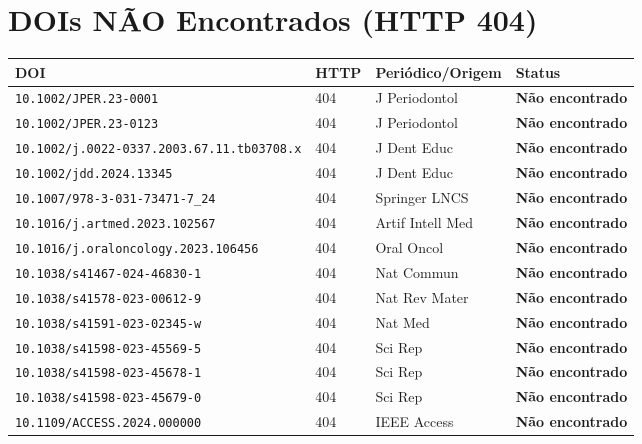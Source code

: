 \section{DOIs NÃO Encontrados (HTTP 404)}

\begin{longtable}{|p{3.5cm}|p{2cm}|p{6.5cm}|p{2cm}|}
\hline
\textbf{DOI} & \textbf{HTTP} & \textbf{Periódico/Origem} & \textbf{Status} \\
\hline
\endhead
\hline
\endfoot
\verb|10.1002/JPER.23-0001| & 404 & J Periodontol & \textbf{Não encontrado} \\
\verb|10.1002/JPER.23-0123| & 404 & J Periodontol & \textbf{Não encontrado} \\
\verb|10.1002/j.0022-0337.2003.67.11.tb03708.x| & 404 & J Dent Educ & \textbf{Não encontrado} \\
\verb|10.1002/jdd.2024.13345| & 404 & J Dent Educ & \textbf{Não encontrado} \\
\verb|10.1007/978-3-031-73471-7_24| & 404 & Springer LNCS & \textbf{Não encontrado} \\
\verb|10.1016/j.artmed.2023.102567| & 404 & Artif Intell Med & \textbf{Não encontrado} \\
\verb|10.1016/j.oraloncology.2023.106456| & 404 & Oral Oncol & \textbf{Não encontrado} \\
\verb|10.1038/s41467-024-46830-1| & 404 & Nat Commun & \textbf{Não encontrado} \\
\verb|10.1038/s41578-023-00612-9| & 404 & Nat Rev Mater & \textbf{Não encontrado} \\
\verb|10.1038/s41591-023-02345-w| & 404 & Nat Med & \textbf{Não encontrado} \\
\verb|10.1038/s41598-023-45569-5| & 404 & Sci Rep & \textbf{Não encontrado} \\
\verb|10.1038/s41598-023-45678-1| & 404 & Sci Rep & \textbf{Não encontrado} \\
\verb|10.1038/s41598-023-45679-0| & 404 & Sci Rep & \textbf{Não encontrado} \\
\verb|10.1109/ACCESS.2024.000000| & 404 & IEEE Access & \textbf{Não encontrado} \\

\end{longtable}
